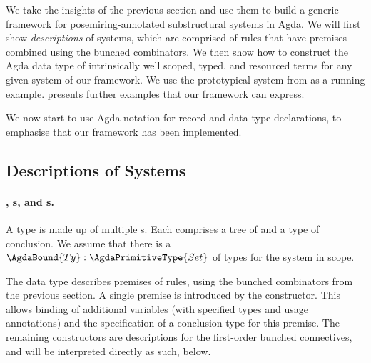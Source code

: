 We take the insights of the previous section and use them to build a
generic framework for posemiring-annotated substructural systems in
Agda. We will first show \emph{descriptions} of systems, which are
comprised of rules that have premises combined using the bunched
combinators. We then show how to construct the Agda data type of
intrinsically well scoped, typed, and resourced terms for any given
system of our framework. We use the prototypical system from
 as a running example. 
presents further examples that our framework can express.

We now start to use Agda notation for record and data type
declarations, to emphasise that our framework has been implemented.

\subsection{Descriptions of Systems}


\paragraph{, s, and s.}

A type  is made up of multiple s.
Each  comprises a tree of  and
a type of conclusion. We assume that there is a
$\AgdaBound{Ty} : \AgdaPrimitiveType{Set}$ of types for the system in
scope.

The  data type describes premises of rules,
using the bunched combinators from the previous section. A single
premise is introduced by the
constructor.  This allows binding of additional variables
\AgdaBound{$\Delta$} (with specified types and usage annotations) and
the specification of a conclusion type  for this premise.
The remaining constructors are descriptions for the first-order
bunched connectives, and will be interpreted directly as such, below.

